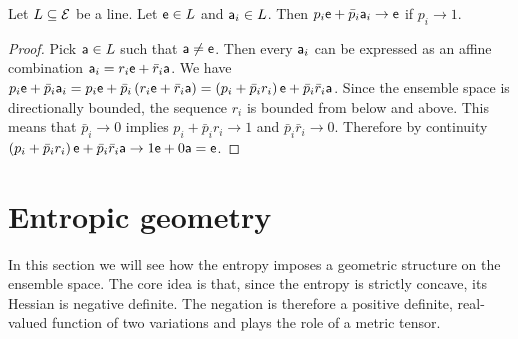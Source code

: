 \begin{mathSection}
	\begin{prop}
		Let $L \subseteq \Ens$ be a line. Let $\ens \in L$ and $\ens[a]_i \in L$. Then $p_i \ens + \bar{p}_i \ens[a]_i \to \ens$ if $p_i \to 1$.
	\end{prop}
	
	\begin{proof}
		Pick $\ens[a] \in L$ such that $\ens[a] \neq \ens$. Then every $\ens[a]_i$ can be expressed as an affine combination $\ens[a]_i = r_i \ens + \bar{r}_i \ens[a]$. We have $p_i \ens + \bar{p}_i \ens[a]_i = p_i \ens + \bar{p}_i \left( r_i \ens + \bar{r}_i \ens[a] \right) = \left( p_i + \bar{p}_i r_i \right) \ens + \bar{p}_i\bar{r}_i \ens[a]$. Since the ensemble space is directionally bounded, the sequence $r_i$ is bounded from below and above. This means that $\bar{p}_i \to 0$ implies $p_i + \bar{p}_i r_i \to 1$ and $\bar{p}_i\bar{r}_i \to 0$. Therefore by continuity $\left( p_i + \bar{p}_i r_i \right) \ens + \bar{p}_i\bar{r}_i \ens[a] \to 1 \ens + 0 \ens[a] = \ens$.
	\end{proof}
\end{mathSection}




\section{Entropic geometry}

In this section we will see how the entropy imposes a geometric structure on the ensemble space. The core idea is that, since the entropy is strictly concave, its Hessian is negative definite. The negation is therefore a positive definite, real-valued function of two variations and plays the role of a metric tensor.

